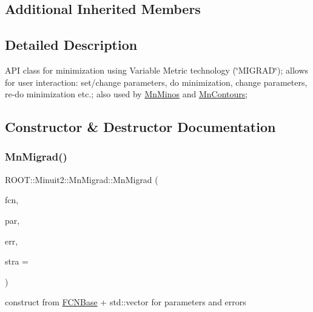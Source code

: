 \subsection*{Additional Inherited Members}


\subsection{Detailed Description}
A\+PI class for minimization using Variable Metric technology (\char`\"{}\+M\+I\+G\+R\+A\+D\char`\"{}); allows for user interaction\+: set/change parameters, do minimization, change parameters, re-\/do minimization etc.; also used by \mbox{\hyperlink{classROOT_1_1Minuit2_1_1MnMinos}{Mn\+Minos}} and \mbox{\hyperlink{classROOT_1_1Minuit2_1_1MnContours}{Mn\+Contours}}; 

\subsection{Constructor \& Destructor Documentation}
\mbox{\label{classROOT_1_1Minuit2_1_1MnMigrad_a3a3610c55a91cb68fb3b95506ff08339}} 
\subsubsection{\texorpdfstring{MnMigrad()}{MnMigrad()}\hspace{0.1cm}{\footnotesize\ttfamily [1/26]}}
{\footnotesize\ttfamily R\+O\+O\+T\+::\+Minuit2\+::\+Mn\+Migrad\+::\+Mn\+Migrad (\begin{DoxyParamCaption}\item[{const \mbox{\hyperlink{classROOT_1_1Minuit2_1_1FCNBase}{F\+C\+N\+Base}} \&}]{fcn,  }\item[{const std\+::vector$<$ double $>$ \&}]{par,  }\item[{const std\+::vector$<$ double $>$ \&}]{err,  }\item[{unsigned int}]{stra = {} }\end{DoxyParamCaption})\hspace{0.3cm}{\ttfamily [inline]}}



construct from \mbox{\hyperlink{classROOT_1_1Minuit2_1_1FCNBase}{F\+C\+N\+Base}} + std\+::vector for parameters and errors 

